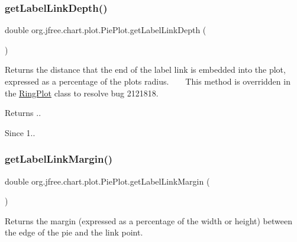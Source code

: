 \subsubsection{\texorpdfstring{get\+Label\+Link\+Depth()}{getLabelLinkDepth()}}
{\footnotesize\ttfamily double org.\+jfree.\+chart.\+plot.\+Pie\+Plot.\+get\+Label\+Link\+Depth (\begin{DoxyParamCaption}{ }\end{DoxyParamCaption})\hspace{0.3cm}{\ttfamily [protected]}}

Returns the distance that the end of the label link is embedded into the plot, expressed as a percentage of the plot\textquotesingle{}s radius. ~\newline
~\newline
 This method is overridden in the \mbox{\hyperlink{classorg_1_1jfree_1_1chart_1_1plot_1_1_ring_plot}{Ring\+Plot}} class to resolve bug 2121818.

\begin{DoxyReturn}{Returns}
{.}.
\end{DoxyReturn}
\begin{DoxySince}{Since}
1.. 
\end{DoxySince}
\mbox{\label{classorg_1_1jfree_1_1chart_1_1plot_1_1_pie_plot_a94034ed3c2584aba485d418db6217ac9}} 
\subsubsection{\texorpdfstring{get\+Label\+Link\+Margin()}{getLabelLinkMargin()}}
{\footnotesize\ttfamily double org.\+jfree.\+chart.\+plot.\+Pie\+Plot.\+get\+Label\+Link\+Margin (\begin{DoxyParamCaption}{ }\end{DoxyParamCaption})}

Returns the margin (expressed as a percentage of the width or height) between the edge of the pie and the link point.

